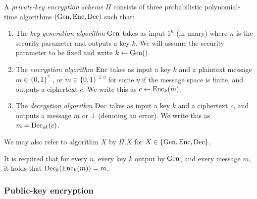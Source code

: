 \begin{definition}
	A \emph{private-key encryption scheme} $\Pi$ consists of three probabilistic polynomial-time algorithms $(\mathrm{Gen}, \mathrm{Enc}, \mathrm{Dec})$ such that:
	\begin{enumerate}[1.]
		\item The \emph{key-generation algorithm} $\mathrm{Gen}$ takes as input $1^n$ (in unary) where $n$ is the security parameter and outputs a key $k$. We will assume the security parameter to be fixed and write $k \leftarrow \mathrm{Gen}()$.
		\item The \emph{encryption algorithm} $\mathrm{Enc}$ takes as input a key $k$ and a plaintext message $m \in \{0, 1\}^*$ , or $m \in \{0, 1\}^{\le \eta}$ for some $\eta$ if the message space is finite, and outputs a ciphertext $c$. We write this as $c \leftarrow \mathrm{Enc}_k(m)$.
		\item The \emph{decryption algorithm} $\mathrm{Dec}$ takes as input a key $k$ and a ciphertext $c$, and outputs a message $m$ or $\bot$ (denoting an error). We write this as $m = \mathrm{Dec}_{sk}(c)$.
	\end{enumerate}

	We may also refer to algorithm $X$ by $\Pi.X$ for $X \in \{\mathrm{Gen}, \mathrm{Enc}, \mathrm{Dec}\}$.

	It is required that for every $n$, every key $k$ output by $\mathrm{Gen}$, and every message $m$, it holds that $\mathrm{Dec}_k(\mathrm{Enc}_k(m)) = m$.
\end{definition}

\subsubsection{Public-key encryption}


